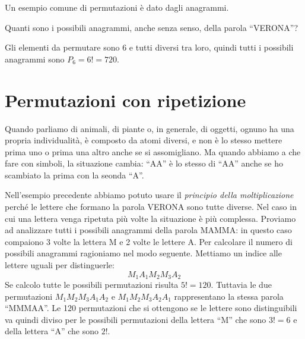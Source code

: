 Un esempio comune di permutazioni è dato dagli anagrammi.
\begin{esempio}
Quanti sono i possibili anagrammi, anche senza senso, della parola 
``VERONA''?

Gli elementi da permutare sono 6 e tutti diversi tra loro, 
quindi tutti i possibili anagrammi sono \(P_6 = 6!= 720\).
\end{esempio}




\section{Permutazioni con ripetizione}
\label{sec:calc_combinatorio_con_ripetizione}

Quando parliamo di animali, di piante o, in generale, di oggetti, ognuno ha 
una propria individualità, è composto da atomi diversi, e non è lo stesso 
mettere prima uno o prima una altro anche se si assomigliano.
Ma quando abbiamo a che fare con simboli, la situazione cambia:
``AA'' è lo stesso di ``AA'' anche se ho scambiato la prima con la seonda 
``A''.

Nell'esempio precedente abbiamo potuto usare il \emph{principio della 
moltiplicazione} perché le lettere che formano la parola VERONA sono tutte 
diverse. Nel caso in cui una lettera venga ripetuta più volte la situazione è 
più complessa.
Proviamo ad analizzare tutti i possibili anagrammi della parola MAMMA: in 
questo caso compaiono 3 volte la lettera M e 2 volte le lettere A. Per calcolare 
il numero di possibili anagrammi ragioniamo nel modo seguente. Mettiamo un 
indice alle lettere uguali per distinguerle:
\[M_1 A_1 M_2 M_3 A_2\]
Se calcolo tutte le possibili permutazioni risulta \(5! = 120\). 
Tuttavia le due permutazioni 
\(M_1 M_2 M_3 A_1 A_2\) e \(M_1 M_2 M_3 A_2 A_1\) 
rappresentano la stessa parola ``MMMAA''. 
Le 120 permutazioni che si ottengono se le lettere sono 
distinguibili va quindi diviso per le possibili permutazioni della lettera 
``M'' che sono \(3!=6\) e della lettera ``A'' che sono \(2!\). 

